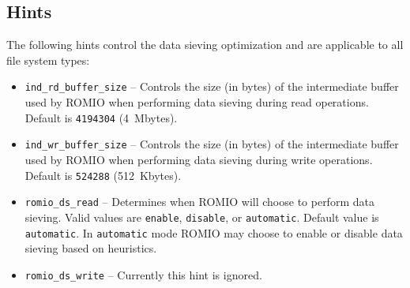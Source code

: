 \subsection{Hints}
\label{sec:hints}

The following hints control the data sieving optimization and are
applicable to all file system types:
\begin{itemize}
\item \texttt{ind\_rd\_buffer\_size} -- Controls the size (in bytes) of the
intermediate buffer used by ROMIO when performing data sieving during
read operations.  Default is \texttt{4194304} (4~Mbytes).
\item \texttt{ind\_wr\_buffer\_size} -- Controls the size (in bytes) of the
intermediate buffer used by ROMIO when performing data sieving during
write operations.  Default is \texttt{524288} (512~Kbytes).
\item \texttt{romio\_ds\_read} -- 
Determines when ROMIO will choose to perform data sieving.
Valid values are \texttt{enable}, \texttt{disable}, or \texttt{automatic}.
Default value is \texttt{automatic}.  In \texttt{automatic} mode ROMIO
may choose to enable or disable data sieving based on heuristics.
\item \texttt{romio\_ds\_write} -- Currently this hint is ignored.
\end{itemize}

